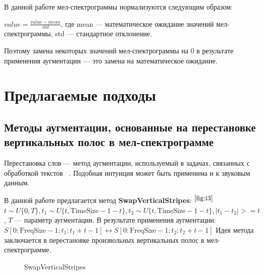 \documentclass[12pt, fleqn]{article}
\begin{document}
В данной работе мел-спектрограммы нормализуются следующим образом: 

$ value = \frac{value - mean}{std}$, где mean --- математическое ожидание значений мел-спектрограммы, std --- стандартное отклонение. 

Поэтому замена некоторых значений мел-спектрограммы на 0 в результате применения аугментации --- это замена на математическое ожидание.

\section{Предлагаемые подходы}

\subsection{Методы аугментации, основанные на перестановке вертикальных полос в мел-спектрограмме}

Перестановка слов --- метод аугментации, используемый в задачах, связанных с обработкой текстов ~\cite{RandomSwap}. Подобная интуиция может быть применима и к звуковым данным. 

В данной работе предлагается метод \textbf{SwapVerticalStripes}: $^{\ref{fig:i3}}$ \newline
$t \sim U\{0, T\}, t_1 \sim U\{t, \text{TimeSize} - 1 - t\}, t_2 \sim U\{t, \text{TimeSize} - 1 - t\}, |t_1 - t_2| >= t $, \newline $T$ --- параметр аугментации. \newline 
В результате применения аугментации: \newline
$S[0:\text{FreqSize} - 1; t_1: t_1 + t - 1] \leftrightarrow S[0:\text{FreqSize} - 1; t_2 : t_2 + t - 1]$ \newline
Идея метода заключается в перестановке произвольных вертикальных полос в мел-спектрограмме.
\begin{figure}[ht!]
	\caption{SwapVerticalStripes}
	\label{fig:i3}
\end{figure}
\end{document}
